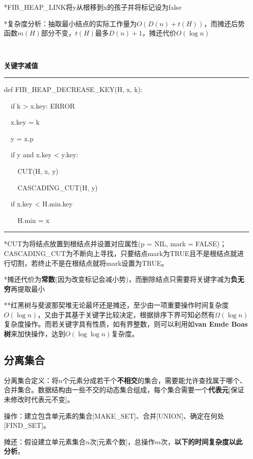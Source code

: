 \documentclass[a4paper,UTF8,fontset=windows]{ctexart}
\newenvironment{code}{\rule{36em}{0.1em}\setlength{\parindent}{1em}

}{

\setlength{\parindent}{0em}\rule{36em}{0.1em}}
\begin{document}
*\hspace{0em}FIB\_HEAP\_LINK将y从根移到x的孩子并将标记设为false

*\hspace{0em}复杂度分析：抽取最小结点的实际工作量为$O(D(n)+t(H))$，而摊还后势函数$m(H)$部分不变，$t(H)$最多$D(n)+1$，摊还代价$O(\log n)$

\

\textbf{关键字减值}

\begin{code}
def FIB\_HEAP\_DECREASE\_KEY(H, x, k):

\ \ if k > x.key: ERROR

\ \ x.key = k

\ \ y = x.p

\ \ if y and x.key < y.key:

\ \ \ \ CUT(H, x, y)

\ \ \ \ CASCADING\_CUT(H, y)

\ \ if x.key < H.min.key

\ \ \ \ H.min = x
\end{code}

*\hspace{0em}CUT为将结点放置到根结点并设置对应属性(p = NIL, mark = FALSE)；CASCADING\_CUT为不断向上寻找，只要结点mark为TRUE且不是根结点就进行切割，若终止不是在根结点就将mark设置为TRUE。

*\hspace{0em}摊还代价为\textbf{常数}(因为改变标记会减小势)，而删除结点只需要将关键字减为\textbf{负无穷}再提取最小

**\hspace{0em}红黑树与斐波那契堆无论最坏还是摊还，至少由一项重要操作时间复杂度$O(\log n)$，又由于其基于关键字比较决定，根据排序下界可知必然有$\Omega(\log n)$复杂度操作。而若关键字具有性质，如有界整数，则可以利用如\textbf{van Emde Boas树}来加快操作，达到$O(\log\log n)$复杂度。

\subsection{分离集合}

分离集合定义：将$n$个元素分成若干个\textbf{不相交}的集合，需要能允许查找属于哪个、合并集合。数据结构由一些不交的动态集合组成，每个集合需要一个\textbf{代表元}[保证未修改时代表元不变]。

操作：建立包含单元素的集合[MAKE\_SET]、合并[UNION]、确定在何处[FIND\_SET]。

摊还：假设建立单元素集合$n$次[元素个数]，总操作$m$次，\textbf{以下的时间复杂度以此分析}。
\end{document}
